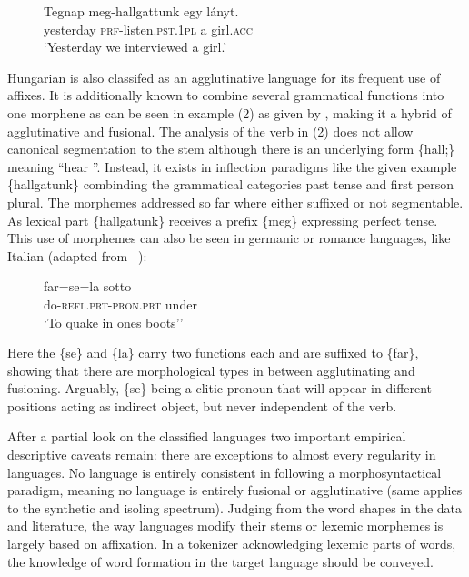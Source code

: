 \begin{figure}[h]
\centering
\label{fig:hun}
\begin{exe}
    \ex
    \gll  Tegnap meg-hallgattunk egy lányt. \\
    yesterday \textsc{prf}-listen.\textsc{pst.1pl} a girl.\textsc{acc}\\
    \glt  `Yesterday we interviewed a girl.'
\end{exe}
\end{figure}


Hungarian is also classifed as an agglutinative language for its frequent use of affixes.
It is additionally known to combine several grammatical functions into one morphene as can be seen in example (2) as given by \textcite[262]{hunverbs}, making it a hybrid of agglutinative and fusional.
The analysis of the verb in (2) does not allow canonical segmentation to the stem although there is an underlying form \{hall;\textasteriskcentered\} meaning \textquotedblleft hear \textquotedblright.
Instead, it exists in inflection paradigms like the given example \{hallgatunk\} combinding the grammatical categories past tense and first person plural.
The morphemes addressed so far where either suffixed or not segmentable.
As lexical part \{hallgatunk\} receives a prefix \{meg\} expressing perfect tense.
This use of morphemes can also be seen in germanic or romance languages, like Italian (adapted from ~\textcite[163]{itaverbs}):

\begin{figure}[H]
\centering
    \label{fig:ita}
    \begin{exe}
        \ex
        \gll  far=se=la sotto \\
        do-\textsc{refl.prt}-\textsc{pron.prt} under\\
        \glt  `To quake in one\textquotesingle s boots’'
    \end{exe}
\end{figure}

Here the \{se\} and \{la\} carry two functions each and are suffixed to \{far\}, showing that there are morphological types in between agglutinating and fusioning.
Arguably, \{se\} being a clitic pronoun that will appear in different positions acting as indirect object, but never independent of the verb.


After a partial look on the classified languages two important empirical descriptive caveats remain: there are exceptions to almost every regularity in languages.
No language is entirely consistent in following a morphosyntactical paradigm, meaning no language is entirely fusional or agglutinative (same applies to the synthetic and isoling spectrum).
Judging from the word shapes in the data and literature, the way languages modify their stems or lexemic morphemes is largely based on affixation.
In a tokenizer acknowledging lexemic parts of words, the knowledge of word formation in the target language should be conveyed.